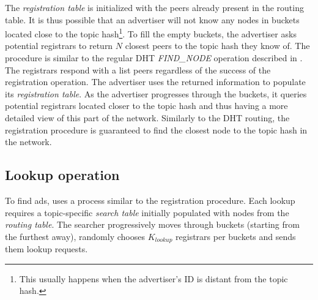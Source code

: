 The \emph{registration table} is initialized with the peers already present in the routing table. It is thus possible that an advertiser will not know any nodes in buckets located close to the topic hash\footnote{This usually happens when the advertiser's ID is distant from the topic hash.}. 
To fill the empty buckets, the advertiser asks potential registrars to return $N$ closest peers to the topic hash they know of. 
The procedure is similar to the regular DHT \emph{FIND\_NODE} operation described in . 
The registrars respond with a list peers regardless of the success of the registration operation. 
The advertiser uses the returned information to populate its \emph{registration table}. 
As the advertiser progresses through the buckets, it queries potential registrars located closer to the topic hash and thus having a more detailed view of this part of the network. 
Similarly to the DHT routing, the registration procedure is guaranteed to find the closest node to the topic hash in the network. 





\subsection{Lookup operation}\label{sec:lookup}
To find ads, \sysname uses a process similar to the registration procedure. 
Each lookup requires a topic-specific \emph{search table} initially populated with nodes from the \emph{routing table}. 
The searcher progressively moves through buckets (starting from the furthest away), randomly chooses $K_\textit{lookup}$ registrars per buckets and sends them lookup requests. 


